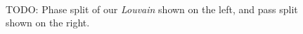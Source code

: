\begin{figure}[hbtp]
  \centering
   \\[-2ex]
  \caption{TODO: Phase split of our \textit{Louvain} shown on the left, and pass split shown on the right.}
  \label{fig:louvainrak-pruning}
\end{figure}
